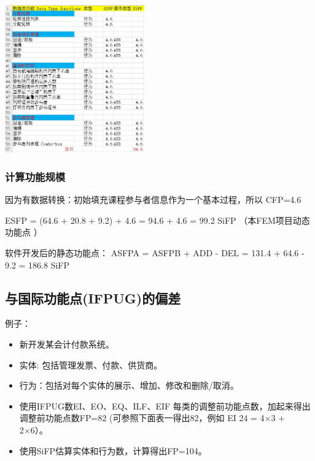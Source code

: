 
\includegraphics[width=6cm]{Ex2XlsPt2of2Screenshot_2022-04-05_143941.jpg}

\hypertarget{ux8ba1ux7b97ux529fux80fdux89c4ux6a21-1}{%
\subsubsection{计算功能规模}\label{ux8ba1ux7b97ux529fux80fdux89c4ux6a21-1}}

\begin{description}
\item[]
\end{description}

因为有数据转换：初始填充课程参与者信息作为一个基本过程，所以 CFP=4.6

\begin{description}
\tightlist
\item[]
ESFP = (64.6 + 20.8 + 9.2) + 4.6 = 94.6 + 4.6 = 99.2 SiFP
（本FEM项目动态功能点 ）
\end{description}

软件开发后的静态功能点： ASFPA = ASFPB + ADD - DEL = 131.4 + 64.6 - 9.2
= 186.8 SiFP

\hypertarget{ux4e0eux56fdux9645ux529fux80fdux70b9ifpugux7684ux504fux5dee}{%
\subsection{与国际功能点(IFPUG)的偏差}\label{ux4e0eux56fdux9645ux529fux80fdux70b9ifpugux7684ux504fux5dee}}

例子：

\begin{itemize}
\tightlist
\item
  新开发某会计付款系统。
\item
  实体: 包括管理发票、付款、供货商。
\item
  行为：包括对每个实体的展示、增加、修改和删除/取消。
\item
  使用IFPUG数EI、EO、EQ、ILF、EIF
  每类的调整前功能点数，加起来得出调整前功能点数FP=82
  (可参照下面表一得出82，例如 EI 24 = 4×3 + 2×6）。
\item
  使用SiFP估算实体和行为数，计算得出FP=104。
\end{itemize}

